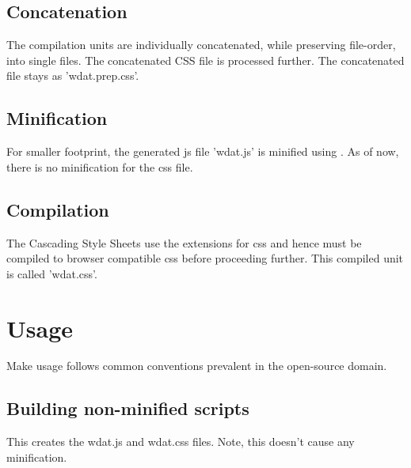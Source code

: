 \subsection{Concatenation}

The compilation units are individually concatenated, while preserving
file-order, into single files. The concatenated CSS file is processed
further.  The concatenated file stays as 'wdat.prep.css'.

\subsection{Minification}

For smaller footprint, the generated js file 'wdat.js' is minified
using
.
As of now, there is no minification for the css file.

\subsection{Compilation}

The Cascading Style Sheets use the
 extensions for css
and hence must be compiled to browser compatible css before proceeding
further.  This compiled unit is called 'wdat.css'.

\section{Usage}

Make usage follows common conventions prevalent in the open-source
domain.

\subsection{Building non-minified scripts}

\lstset{language=sh, tabsize=4}

This creates the wdat.js and wdat.css files.  Note, this doesn't cause
any minification.

